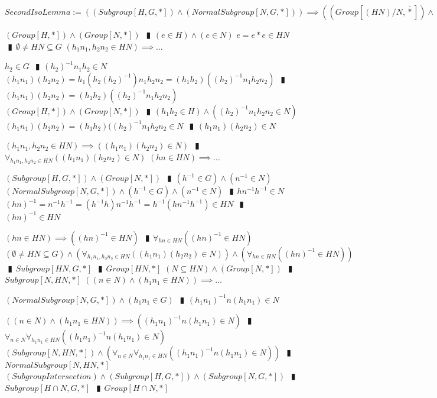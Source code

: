 \documentclass{book}
\newcommand{\abr}{:=}
\newcommand{\pipe}{$\phantom{(}\vrectangleblack\phantom{)}$}
\newcommand{\bbin}[1]{\mathbin{{\bar{#1}}}}
\begin{document}
$SecondIsoLemma \abr ((Subgroup[H, G, *]) \land (NormalSubgroup[N, G, *])) \implies ((Group[(H N) / N, \bbin{*}]) \land (Group[H / (H \cap N), \bbin{*}]))$
\begin{enumerate}
  \lit $(Group[H, *]) \land (Group[N, *])$ \pipe $(e \in H) \land (e \in N)$
  \lit $e = e * e \in H N$ \pipe $\emptyset \neq H N \subseteq G$
  \lit $(h_1 n_1, h_2 n_2 \in H N) \implies \ldots$
  \begin{enumerate}
    \lit $h_2 \in G$ \pipe $(h_2)^{-1} n_1 h_2 \in N$
    \lit $(h_1 n_1) (h_2 n_2) = h_1 (h_2 (h_2)^{-1}) n_1 h_2 n_2 = (h_1 h_2) ((h_2)^{-1} n_1 h_2 n_2)$ \pipe $(h_1 n_1) (h_2 n_2) = (h_1 h_2) ((h_2)^{-1} n_1 h_2 n_2)$
    \lit $(Group[H, *]) \land (Group[N, *])$ \pipe $(h_1 h_2 \in H) \land ((h_2)^{-1} n_1 h_2 n_2 \in N)$
    \lit $(h_1 n_1) (h_2 n_2) = (h_1 h_2) ((h_2)^{-1} n_1 h_2 n_2 \in N$ \pipe $(h_1 n_1) (h_2 n_2) \in N$
  \end{enumerate}
  \lit $(h_1 n_1, h_2 n_2 \in H N) \implies ((h_1 n_1) (h_2 n_2) \in N)$ \pipe $\forall_{h_1 n_1, h_2 n_2 \in H N}((h_1 n_1) (h_2 n_2) \in N)$
  \lit $(h n \in H N) \implies \ldots$
  \begin{enumerate}
    \lit $(Subgroup[H, G, *]) \land (Group[N, *])$ \pipe $(h^{-1} \in G) \land (n^{-1} \in N)$ 
    \lit $(NormalSubgroup[N, G, *]) \land (h^{-1} \in G) \land (n^{-1} \in N)$ \pipe  $h n^{-1} h^{-1} \in N$
    \lit $(h n)^{-1} = n^{-1} h^{-1} = (h^{-1} h) n^{-1} h^{-1} = h^{-1} (h n^{-1} h^{-1}) \in H N$ \pipe $(h n)^{-1} \in H N$
  \end{enumerate}
  \lit $(h n \in H N) \implies ((h n)^{-1} \in H N)$ \pipe $\forall_{h n \in H N}((h n)^{-1} \in H N)$
  \lit $(\emptyset \neq H N \subseteq G) \land (\forall_{h_1 n_1, h_2 n_2 \in H N}((h_1 n_1) (h_2 n_2) \in N)) \land (\forall_{h n \in H N}((h n)^{-1} \in H N))$ \pipe $Subgroup[H N, G, *]$ \pipe $Group[H N, *]$
  \lit $(N \subseteq H N) \land (Group[N, *])$ \pipe $Subgroup[N, H N, *]$
  \lit $((n \in N) \land (h_1 n_1 \in H N)) \implies \ldots$
  \begin{enumerate}
    \lit $(NormalSubgroup[N, G, *]) \land (h_1 n_1 \in G)$ \pipe $(h_1 n_1)^{-1} n (h_1 n_1) \in N$
  \end{enumerate}
  \lit $((n \in N) \land (h_1 n_1 \in H N)) \implies ((h_1 n_1)^{-1} n (h_1 n_1) \in N)$ \pipe $\forall_{n \in N} \forall_{h_1 n_1 \in H N}((h_1 n_1)^{-1} n (h_1 n_1) \in N)$
  \lit $(Subgroup[N, H N, *]) \land (\forall_{n \in N} \forall_{h_1 n_1 \in H N}((h_1 n_1)^{-1} n (h_1 n_1) \in N))$ \pipe $NormalSubgroup[N, H N, *]$
  \lit $(SubgroupIntersection) \land (Subgroup[H, G, *]) \land (Subgroup[N, G, *])$ \pipe $Subgroup[H \cap N, G, *]$ \pipe $Group[H \cap N, *]$

\end{enumerate}
\end{document}
